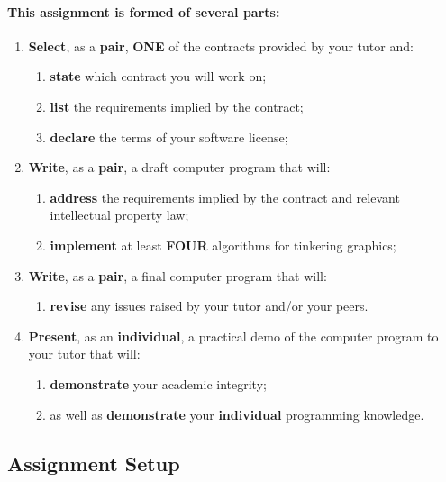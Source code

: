 \documentclass{../../fal_assignment}
\begin{document}
\paragraph{This assignment is formed of several parts:}

\begin{enumerate}
    \item \textbf{Select}, as a \textbf{pair}, \textbf{ONE} of the contracts provided by your tutor and:
    	\begin{enumerate}
    		\item \textbf{state} which contract you will work on;
    		\item \textbf{list} the requirements implied by the contract;
    		\item \textbf{declare} the terms of your software license;
	\end{enumerate}
    \item \textbf{Write}, as a \textbf{pair}, a draft computer program that will:
    	\begin{enumerate}
    		\item \textbf{address} the requirements implied by the contract and relevant intellectual property law;
    		\item \textbf{implement} at least \textbf{FOUR} algorithms for tinkering graphics;
	\end{enumerate}
    \item \textbf{Write}, as a \textbf{pair}, a final computer program that will:
    	\begin{enumerate}
    		\item \textbf{revise} any issues raised by your tutor and/or your peers.
	\end{enumerate}
    \item \textbf{Present}, as an \textbf{individual}, a practical demo of the computer program to your tutor that will:
    	\begin{enumerate}
    		\item \textbf{demonstrate} your academic integrity;
    		\item as well as \textbf{demonstrate} your \textbf{individual} programming knowledge.
	\end{enumerate}
\end{enumerate}

\subsection*{Assignment Setup}
\end{document}

